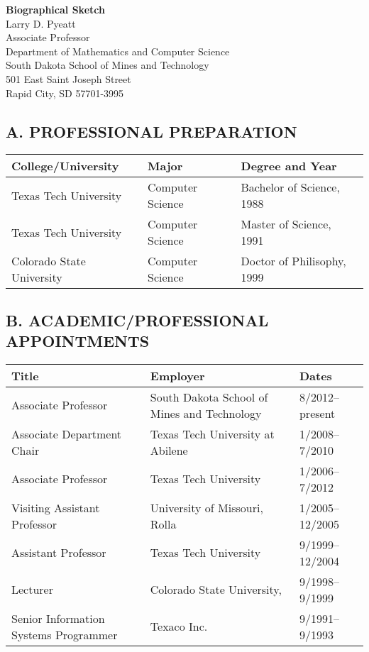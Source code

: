 \documentclass[11pt]{article}
\begin{document}
\pagestyle{fancyplain}
\thispagestyle{empty}

\begin{center}
  {\bf Biographical Sketch}\\
  Larry D. Pyeatt\\
  Associate Professor\\
  Department of Mathematics and Computer Science\\
  South Dakota School of Mines and Technology\\
  501 East Saint Joseph Street\\
  Rapid City, SD 57701-3995
\end{center}


\subsection*{A. PROFESSIONAL PREPARATION}
\noindent\begin{tabular}{lll}
College/University & Major & Degree and Year\\
\hline
  Texas Tech University & Computer Science & Bachelor of Science, 1988\\
  Texas Tech University & Computer Science & Master of Science, 1991 \\
  Colorado State University &Computer Science & Doctor of Philisophy, 1999\\
\end{tabular}

\subsection*{B. ACADEMIC/PROFESSIONAL APPOINTMENTS}
\noindent\begin{tabular}{lll}
Title & Employer & Dates\\
\hline
Associate Professor & South Dakota School of Mines and Technology &8/2012--present\\
Associate Department Chair & Texas Tech University at Abilene  & 1/2008--7/2010\\
Associate Professor & Texas Tech University & 1/2006--7/2012\\
Visiting Assistant Professor & University of Missouri, Rolla & 1/2005--12/2005\\
Assistant Professor & Texas Tech University & 9/1999--12/2004\\
Lecturer & Colorado State University,  & 9/1998--9/1999\\
Senior Information Systems Programmer & Texaco Inc. & 9/1991--9/1993
\end{tabular}
\end{document}
